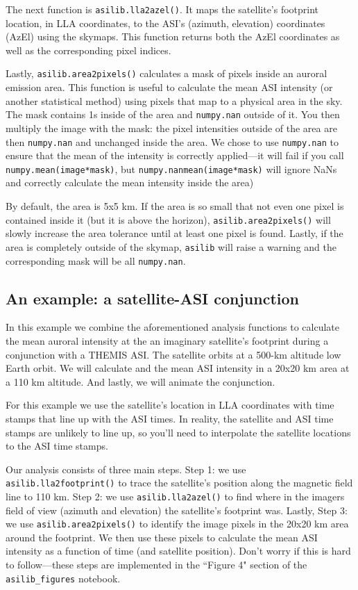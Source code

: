 \documentclass[draft]{agujournal2019}
\begin{document}
The next function is \verb|asilib.lla2azel()|. It maps the satellite's footprint location, in LLA coordinates, to the ASI's (azimuth, elevation) coordinates (AzEl) using the skymaps. This function returns both the AzEl coordinates as well as the corresponding pixel indices.

Lastly, \verb|asilib.area2pixels()| calculates a mask of pixels inside an auroral emission area. This function is useful to calculate the mean ASI intensity (or another statistical method) using pixels that map to a physical area in the sky. The mask contains 1s inside of the area and \verb|numpy.nan| outside of it. You then multiply the image with the mask: the pixel intensities outside of the area are then \verb|numpy.nan| and unchanged inside the area. We chose to use \verb|numpy.nan| to ensure that the mean of the intensity is correctly applied---it will fail if you call \verb|numpy.mean(image*mask)|, but \verb|numpy.nanmean(image*mask)| will ignore NaNs and correctly calculate the mean intensity inside the area)

By default, the area is 5x5 km. If the area is so small that not even one pixel is contained inside it (but it is above the horizon), \verb|asilib.area2pixels()| will slowly increase the area tolerance until at least one pixel is found. Lastly, if the area is completely outside of the skymap, \verb|asilib| will raise a warning and the corresponding mask will be all \verb|numpy.nan|. 

\subsection{An example: a satellite-ASI conjunction}\label{satellite_conjunction}
In this example we combine the aforementioned analysis functions to calculate the mean auroral intensity at the an imaginary satellite's footprint during a conjunction with a THEMIS ASI. The satellite orbits at a 500-km altitude low Earth orbit. We will calculate and the mean ASI intensity in a 20x20 km area at a 110 km altitude. And lastly, we will animate the conjunction.

For this example we use the satellite's location in LLA coordinates with time stamps that line up with the ASI times. In reality, the satellite and ASI time stamps are unlikely to line up, so you'll need to interpolate the satellite locations to the ASI time stamps.

Our analysis consists of three main steps. Step 1: we use \verb|asilib.lla2footprint()| to trace the satellite's position along the magnetic field line to 110 km. Step 2: we use \verb|asilib.lla2azel()| to find where in the imagers field of view (azimuth and elevation) the satellite's footprint was. Lastly, Step 3: we use \verb|asilib.area2pixels()| to identify the image pixels in the 20x20 km area around the footprint. We then use these pixels to calculate the mean ASI intensity as a function of time (and satellite position). Don't worry if this is hard to follow---these steps are implemented in the ``Figure 4" section of the \verb|asilib_figures| notebook.
\end{document}
